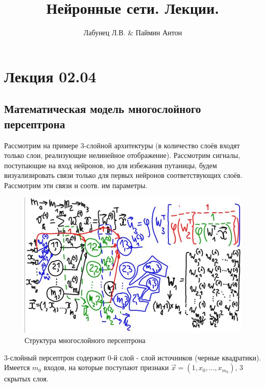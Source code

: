\documentclass{article}
\numberwithin{equation}{subsection}
\begin{document}
\author{Лабунец Л.В. \& Паймин Антон}
\title{Нейронные сети. Лекции.}

\makeatletter
\begin{center}
    {\fontsize{14pt}{24pt}\selectfont\bfseries\@title\par}
    {\fontsize{14pt}{16pt}\@author\par}
\end{center}
\makeatother

\tableofcontents
\newpage

\section{Лекция 02.04}

\subsection{Математическая модель многослойного персептрона}

Рассмотрим на примере 3-слойной архитектуры (в количество слоёв входят только 
слои, реализующие нелинейное отображение).
Рассмотрим сигналы, поступающие на вход нейронов, но для избежания 
путаницы, будем визуализировать связи только для первых нейронов соответствующих слоёв.
Рассмотрим эти связи и соотв. им параметры.

\begin{figure}[htbp]
    \centering
    \includegraphics[width=\textwidth]{hyperflat_3_1.jpeg}
    \caption{Структура многослойного персептрона}
    \label{hyperflat_3_1}
\end{figure}

3-слойный персептрон содержит 0-й слой - слой источников (черные квадратики). 
Имеется $m_{0}$ входов, на которые поступают признаки 
$\vec{x} = (1, x_0, ..., x_{m_{0}})$, 3 скрытых слоя.
\end{document}
